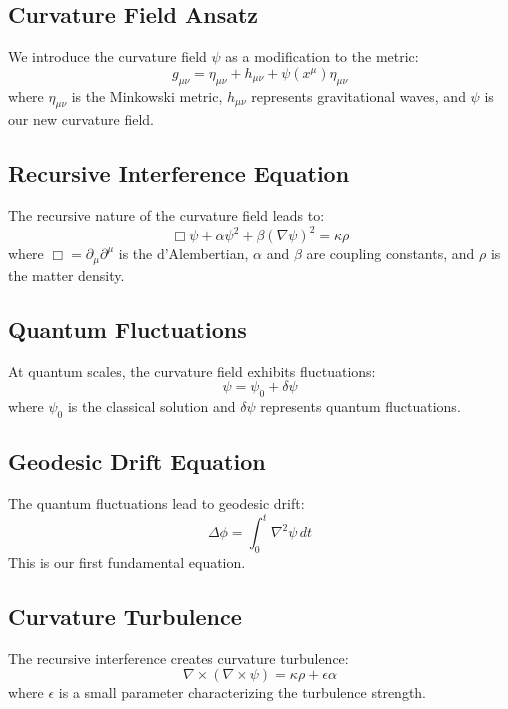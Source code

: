 \documentclass[11pt]{article}
\begin{document}
\subsection{Curvature Field Ansatz}
We introduce the curvature field $\psi$ as a modification to the metric:
\begin{equation}
g_{\mu\nu} = \eta_{\mu\nu} + h_{\mu\nu} + \psi(x^\mu)\eta_{\mu\nu}
\end{equation}
where $\eta_{\mu\nu}$ is the Minkowski metric, $h_{\mu\nu}$ represents gravitational waves, and $\psi$ is our new curvature field.

\subsection{Recursive Interference Equation}
The recursive nature of the curvature field leads to:
\begin{equation}
\Box\psi + \alpha\psi^2 + \beta(\nabla\psi)^2 = \kappa\rho
\end{equation}
where $\Box = \partial_\mu\partial^\mu$ is the d'Alembertian, $\alpha$ and $\beta$ are coupling constants, and $\rho$ is the matter density.

\subsection{Quantum Fluctuations}
At quantum scales, the curvature field exhibits fluctuations:
\begin{equation}
\psi = \psi_0 + \delta\psi
\end{equation}
where $\psi_0$ is the classical solution and $\delta\psi$ represents quantum fluctuations.

\subsection{Geodesic Drift Equation}
The quantum fluctuations lead to geodesic drift:
\begin{equation}
\Delta\phi = \int_0^t \nabla^2\psi \, dt
\end{equation}
This is our first fundamental equation.

\subsection{Curvature Turbulence}
The recursive interference creates curvature turbulence:
\begin{equation}
\nabla \times (\nabla \times \psi) = \kappa\rho + \epsilon\alpha
\end{equation}
where $\epsilon$ is a small parameter characterizing the turbulence strength.
\end{document}
